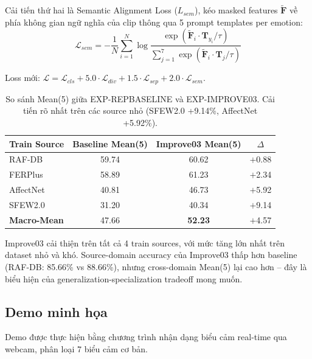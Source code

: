 \documentclass[12pt,a4paper]{article}
\let\oldtextbf\textbf
\renewcommand{\textbf}[1]{\oldtextbf{\textcolor{hcmublue}{#1}}}
\begin{document}
Cải tiến thứ hai là Semantic Alignment Loss ($L_{sem}$), kéo masked features $\tilde{\mathbf{F}}$ về phía không gian ngữ nghĩa của \gls{clip} thông qua 5 prompt templates per emotion:
\begin{equation}
    \mathcal{L}_{sem} = -\frac{1}{N} \sum_{i=1}^{N} \log \frac{\exp(\tilde{\mathbf{F}}_i \cdot \mathbf{T}_{y_i} / \tau)}{\sum_{j=1}^{7} \exp(\tilde{\mathbf{F}}_i \cdot \mathbf{T}_j / \tau)}
\end{equation}

Loss mới: $\mathcal{L} = \mathcal{L}_{cls} + 5.0 \cdot \mathcal{L}_{div} + 1.5 \cdot \mathcal{L}_{sep} + 2.0 \cdot \mathcal{L}_{sem}$.

\begin{table}[H]
\centering
\small
\begin{tabular}{|l|c|c|c|}
\hline
\textbf{Train Source} & \textbf{Baseline Mean(5)} & \textbf{Improve03 Mean(5)} & \textbf{$\Delta$} \\ \hline
RAF-DB    & 59.74 & 60.62 & $+$0.88 \\
FERPlus   & 58.89 & 61.23 & $+$2.34 \\
AffectNet & 40.81 & 46.73 & $+$5.92 \\
SFEW2.0   & 31.20 & 40.34 & $+$9.14 \\ \hline
\textbf{Macro-Mean} & 47.66 & \textbf{52.23} & $+$4.57 \\ \hline
\end{tabular}
\caption{So sánh Mean(5) giữa EXP-REPBASELINE và EXP-IMPROVE03. Cải tiến rõ nhất trên các source nhỏ (SFEW2.0 +9.14\%, AffectNet +5.92\%).}
\label{tab:comparison_summary}
\end{table}

Improve03 cải thiện trên tất cả 4 train sources, với mức tăng lớn nhất trên dataset nhỏ và khó. Source-domain accuracy của Improve03 thấp hơn baseline (RAF-DB: 85.66\% vs 88.66\%), nhưng cross-domain Mean(5) lại cao hơn -- đây là biểu hiện của generalization-specialization tradeoff mong muốn.

\subsection{Demo minh họa}

Demo được thực hiện bằng chương trình nhận dạng biểu cảm real-time qua webcam, phân loại 7 biểu cảm cơ bản.
\end{document}
